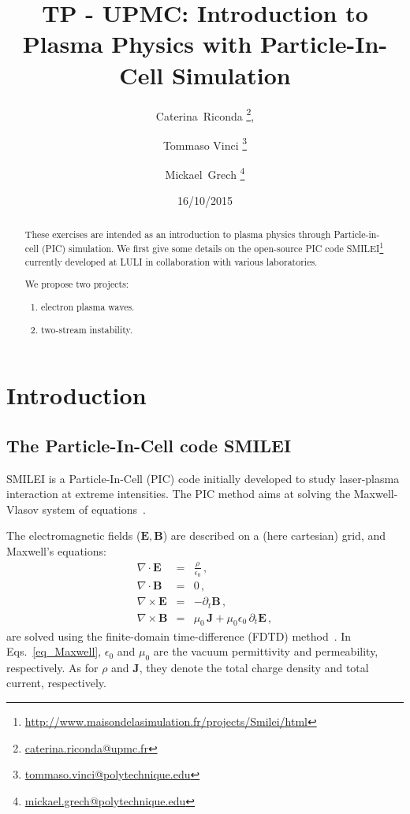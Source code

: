 \documentclass[11pt,a4paper]{article}
\newcommand{\vE}{\mathbf{E}}
\newcommand{\vB}{\mathbf{B}}
\newcommand{\vJ}{\mathbf{J}}
\begin{document}
\title{TP - UPMC: Introduction to Plasma Physics with Particle-In-Cell Simulation}


\author{Caterina~Riconda \footnote{\url{caterina.riconda@upmc.fr}}, \and Tommaso Vinci \footnote{\url{tommaso.vinci@polytechnique.edu}}\and Mickael~Grech \footnote{\url{mickael.grech@polytechnique.edu}}}

\date{16/10/2015}

\maketitle              


\begin{abstract}
These exercises are intended as an introduction to plasma physics through Particle-in-cell (PIC) simulation.
We first give some details on the open-source PIC code SMILEI\footnote{\url{http://www.maisondelasimulation.fr/projects/Smilei/html}} currently developed at LULI in collaboration with various laboratories.

We propose two projects: 
\begin{enumerate}
\item electron plasma waves.
\item two-stream instability.
\end{enumerate}
\end{abstract}




\section*{Introduction}\label{intro}

\subsection*{The Particle-In-Cell code SMILEI}

SMILEI is a Particle-In-Cell (PIC) code initially developed to study laser-plasma interaction at extreme intensities. 
The PIC method aims at solving the Maxwell-Vlasov system of  equations~\cite{birdsall_langdon}.

The electromagnetic fields ($\vE,\vB$) are described on a (here cartesian) grid, and Maxwell's equations:
\begin{subequations}\label{eq_Maxwell}
\begin{eqnarray}
\nabla \cdot \vE &=& \frac{\rho}{\epsilon_0} \,,\\
\nabla \cdot \vB &=& 0 \,,\\
\nabla \times \vE &=& -\partial_t \vB \,,\\
\nabla \times \vB &=& \mu_0\, \vJ + \mu_0 \epsilon_0\,\partial_t \vE \,,
\end{eqnarray}
\end{subequations}
are solved using the finite-domain time-difference (FDTD) method~\cite{taflove_2005}.
In Eqs.~\eqref{eq_Maxwell}, $\epsilon_0$ and $\mu_0$ are the vacuum permittivity and permeability, respectively. 
As for $\rho$ and $\vJ$, they denote the total charge density and total current, respectively.
\end{document}
